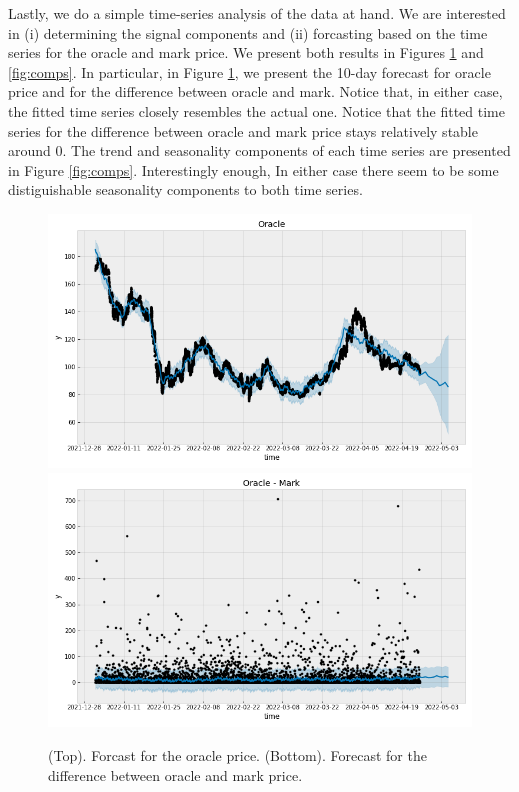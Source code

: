 \documentclass[]{scrartcl}
\begin{document}
Lastly, we do a simple time-series analysis of the data at hand. We are interested in (i) determining the signal components and (ii) forcasting based on the time series for the oracle and mark price.  We present both results in Figures \ref{fig:fore} and \ref{fig:comps}. In particular, in Figure \ref{fig:fore}, we present the 10-day forecast for oracle price and for the difference between oracle and mark. Notice that, in either case, the fitted time series closely resembles the actual one. Notice that the fitted time series for the difference between oracle and mark price stays relatively stable around 0. The trend and seasonality components of each time series are presented in Figure \ref{fig:comps}. Interestingly enough, In either case there seem to be some distiguishable seasonality components to both time series.

 		\begin{figure}
 		\centering
 		\includegraphics[width=0.7\linewidth]{figures/oracle_diff.png}
 		\includegraphics[width=0.7\linewidth]{figures/forecast_diff.png}
 		\caption{(Top). Forcast for the oracle price. (Bottom).  Forecast for the difference between oracle and mark price.}
 		\label{fig:fore}
 	\end{figure}
 
\end{document}
